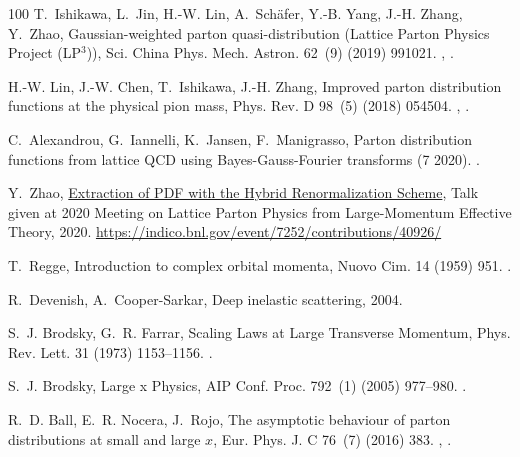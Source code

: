\begin{thebibliography}{100}
T.~Ishikawa, L.~Jin, H.-W. Lin, A.~Sch\"afer, Y.-B. Yang, J.-H. Zhang, Y.~Zhao,
  {Gaussian-weighted parton quasi-distribution (Lattice Parton Physics Project
  (LP$^{3}$))}, Sci. China Phys. Mech. Astron. 62~(9) (2019) 991021.
\newblock \href {http://arxiv.org/abs/1711.07858} {},
  \href {https://doi.org/10.1007/s11433-018-9375-1}
  {}.

H.-W. Lin, J.-W. Chen, T.~Ishikawa, J.-H. Zhang, {Improved parton distribution
  functions at the physical pion mass}, Phys. Rev. D 98~(5) (2018) 054504.
\newblock \href {http://arxiv.org/abs/1708.05301} {},
  \href {https://doi.org/10.1103/PhysRevD.98.054504}
  {}.

C.~Alexandrou, G.~Iannelli, K.~Jansen, F.~Manigrasso, {Parton distribution
  functions from lattice QCD using Bayes-Gauss-Fourier transforms} (7 2020).
\newblock \href {http://arxiv.org/abs/2007.13800} {}.

Y.~Zhao,
  \href{https://indico.bnl.gov/event/7252/contributions/40926/}{Extraction of
  PDF with the Hybrid Renormalization Scheme}, Talk given at 2020 Meeting on
  Lattice Parton Physics from Large-Momentum Effective Theory, 2020.
\newline\urlprefix\url{https://indico.bnl.gov/event/7252/contributions/40926/}

T.~Regge, {Introduction to complex orbital momenta}, Nuovo Cim. 14 (1959) 951.
\newblock \href {https://doi.org/10.1007/BF02728177}
  {}.

R.~Devenish, A.~Cooper-Sarkar, {Deep inelastic scattering}, 2004.

S.~J. Brodsky, G.~R. Farrar, {Scaling Laws at Large Transverse Momentum}, Phys.
  Rev. Lett. 31 (1973) 1153--1156.
\newblock \href {https://doi.org/10.1103/PhysRevLett.31.1153}
  {}.

S.~J. Brodsky, {Large x Physics}, AIP Conf. Proc. 792~(1) (2005) 977--980.
\newblock \href {https://doi.org/10.1063/1.2122201}
  {}.

R.~D. Ball, E.~R. Nocera, J.~Rojo, {The asymptotic behaviour of parton
  distributions at small and large $x$}, Eur. Phys. J. C 76~(7) (2016) 383.
\newblock \href {http://arxiv.org/abs/1604.00024} {},
  \href {https://doi.org/10.1140/epjc/s10052-016-4240-4}
  {}.


\end{thebibliography}
